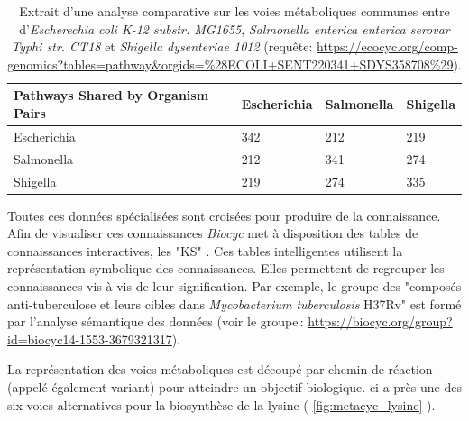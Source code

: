 \begin{refsegment}
    \begin{table}[H]
    	\caption{Extrait d'une analyse comparative sur les voies métaboliques communes entre d'\textit{Escherechia coli K-12 substr. MG1655}, \textit{Salmonella enterica enterica serovar Typhi str. CT18} et \textit{Shigella dysenteriae 1012} (requête: \url{https://ecocyc.org/comp-genomics?tables=pathway&orgids=\%28ECOLI+SENT220341+SDYS358708\%29}). }
    	\label{tab:compare_tools} 
    	\begin{tabular}{l|lll}
    		\toprule
    		Pathways Shared by Organism Pairs & Escherichia & Salmonella & Shigella \\
    		\midrule
    		Escherichia                       & 342         & 212        & 219      \\           
    		Salmonella                        & 212         & 341        & 274      \\           
    		Shigella                          & 219         & 274        & 335      \\ 
    		\bottomrule
    	\end{tabular}
    \end{table}
    
    
    Toutes ces données spécialisées sont croisées pour produire de la connaissance. Afin de visualiser ces connaissances \textit{Biocyc} met à disposition des tables de connaissances interactives, les "\acrfull{KS}" \cite{bat061SmartTable}. Ces tables intelligentes utilisent la représentation symbolique des connaissances. Elles permettent de regrouper les connaissances vis-à-vis de leur signification. Par exemple, le groupe des "composés anti-tuberculose  et leurs cibles dans  \textit{Mycobacterium tuberculosis} H37Rv" est formé par l'analyse sémantique des données (voir le groupe : \url{https://biocyc.org/group?id=biocyc14-1553-3679321317}).
    
    La représentation des voies métaboliques est découpé par chemin de réaction (appelé également variant) pour atteindre un objectif biologique. ci-a près une des six voies alternatives pour la biosynthèse de la lysine ( \cref{fig:metacyc_lysine}  ).
    

\end{refsegment}
